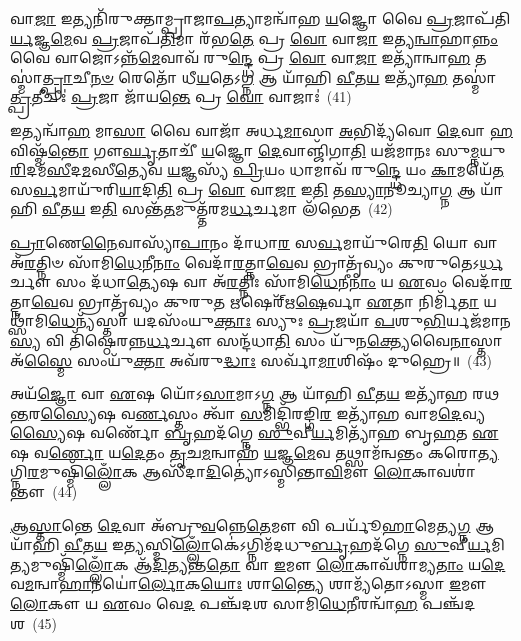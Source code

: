 𑌵𑌾\-\ul{𑌜𑌾} 𑌇𑌤𑍍𑌯𑌨𑌿᳴𑌰𑍁𑌕𑍍𑌤𑌾𑌮𑍍𑌪𑍍𑌰𑌾𑌜𑌾\-\ul{𑌪}\-𑌤𑍍𑌯𑌾𑌮𑌨𑍍𑌵𑌾᳴𑌹 \ul{𑌯}\-𑌜𑍍𑌞𑍋 𑌵𑍈 \ul{𑌪𑍍𑌰}\-𑌜𑌾𑌪᳴𑌤𑌿\-\ul{𑌰𑍍𑌯}\-𑌜𑍍𑌞\-\ul{𑌮𑍇}\-𑌵 \ul{𑌪𑍍𑌰}\-𑌜𑌾𑌪᳴\-\ul{𑌤𑌿}\-𑌮𑌾 𑌰᳴𑌭\-\ul{𑌤𑍇} 𑌪𑍍𑌰 \ul{𑌵𑍋} 𑌵𑌾\-\ul{𑌜𑌾} 𑌇𑌤𑍍𑌯\-\ul{𑌨𑍍𑌵𑌾}\-𑌹𑌾\-\ul{𑌨𑍍𑌨𑌂} 𑌵𑍈 𑌵𑌾𑌜𑍋\-𑌽𑌨𑍍𑌨᳴\-\ul{𑌮𑍇}\-𑌵𑌾𑌵᳴ 𑌰𑍁\-\ul{𑌨𑍍𑌦𑍍𑌧𑍇} 𑌪𑍍𑌰 \ul{𑌵𑍋} 𑌵𑌾\-\ul{𑌜𑌾} 𑌇𑌤𑍍𑌯𑌾᳴𑌨𑍍𑌵𑌾\-\ul{𑌹} 𑌤𑌸𑍍𑌮𑌾॑\-\ul{𑌤𑍍𑌪𑍍𑌰𑌾}\-𑌚𑍀\-\ul{𑌨}\-\-\ul{𑍞} 𑌰𑍇𑌤𑍋᳴ 𑌧𑍀\-\ul{𑌯}\-𑌤𑍇\-𑌽\-\ul{𑌗𑍍𑌨} 𑌆 𑌯𑌾᳴𑌹𑌿 \ul{𑌵𑍀}\-𑌤\-\ul{𑌯} 𑌇𑌤𑍍𑌯𑌾᳴\-\ul{𑌹} 𑌤𑌸𑍍𑌮𑌾॑\-\ul{𑌤𑍍𑌪𑍍𑌰}\-𑌤𑍀𑌚𑍀𑌃॑ \ul{𑌪𑍍𑌰}\-𑌜𑌾 𑌜𑌾᳴𑌯\-\ul{𑌨𑍍𑌤𑍇} 𑌪𑍍𑌰 \ul{𑌵𑍋} 𑌵𑌾𑌜𑌾𑌃॑~(41)

𑌇𑌤𑍍𑌯𑌨𑍍𑌵𑌾᳴\-\ul{𑌹} 𑌮𑌾\-\ul{𑌸𑌾} 𑌵𑍈 𑌵𑌾𑌜𑌾᳴ 𑌅𑌰𑍍𑌧\-\ul{𑌮𑌾}\-𑌸𑌾 \ul{𑌅}\-𑌭𑌿𑌦𑍍𑌯᳴𑌵𑍋 \ul{𑌦𑍇}\-𑌵𑌾 \ul{𑌹}\-𑌵𑌿𑌷𑍍𑌮᳴\-\ul{𑌨𑍍𑌤𑍋} 𑌗𑍗\-\ul{𑌰𑍍𑌘𑍃}\-𑌤𑌾𑌚𑍀᳴ \ul{𑌯}\-𑌜𑍍𑌞𑍋 \ul{𑌦𑍇}\-𑌵𑌾𑌞𑍍𑌜𑌿᳴𑌗𑌾\-\ul{𑌤𑌿} 𑌯𑌜᳴𑌮𑌾𑌨𑌃 𑌸𑍁\-\ul{𑌮𑍍𑌨}\-𑌯𑍁\-\ul{𑌰𑌿}\-𑌦𑌮᳴\-\ul{𑌸𑍀}\-𑌦\-\ul{𑌮}\-𑌸𑍀\-\ul{𑌤𑍍𑌯𑍇}\-𑌵 \ul{𑌯}\-𑌜𑍍𑌞𑌸𑍍𑌯᳴ \ul{𑌪𑍍𑌰𑌿}\-𑌯𑌂 𑌧𑌾𑌮𑌾𑌵᳴ 𑌰𑍁\-\ul{𑌨𑍍𑌦𑍍𑌧𑍇} 𑌯𑌂 \ul{𑌕𑌾}\-𑌮𑌯𑍇᳴\-\ul{𑌤} 𑌸\-\ul{𑌰𑍍𑌵}\-𑌮𑌾𑌯𑍁᳴𑌰𑌿\-\ul{𑌯𑌾}\-𑌦𑌿\-\ul{𑌤𑌿} 𑌪𑍍𑌰 \ul{𑌵𑍋} 𑌵𑌾\-\ul{𑌜𑌾} 𑌇\-\ul{𑌤𑌿} 𑌤\-\ul{𑌸𑍍𑌯𑌾}\-𑌨𑍂𑌚𑍍𑌯𑌾\-\ul{𑌗𑍍𑌨} 𑌆 𑌯𑌾᳴𑌹𑌿 \ul{𑌵𑍀}\-𑌤\-\ul{𑌯} 𑌇\-\ul{𑌤𑌿} 𑌸𑌨𑍍𑌤᳴\-\ul{𑌤}\-𑌮𑍁𑌤𑍍𑌤᳴𑌰𑌮\-\ul{𑌰𑍍𑌧}\-𑌰𑍍𑌚𑌮𑌾 𑌲᳴𑌭𑍇𑌤~(42)

\-\ul{𑌪𑍍𑌰𑌾}\-𑌣𑍇\-\ul{𑌨𑍈}\-𑌵𑌾𑌸𑍍𑌯𑌾᳴\-\ul{𑌪𑌾}\-𑌨𑌂 𑌦𑌾᳴𑌧𑌾\-\ul{𑌰} 𑌸\-\ul{𑌰𑍍𑌵}\-𑌮𑌾𑌯𑍁᳴𑌰𑍇\-\ul{𑌤𑌿} 𑌯𑍋 𑌵𑌾 𑌅᳴\-\ul{𑌰}\-𑌤𑍍𑌨𑌿𑍞 𑌸𑌾᳴𑌮𑌿\-\ul{𑌧𑍇}\-𑌨𑍀\-\ul{𑌨𑌾𑌂} 𑌵𑍇𑌦𑌾᳴\-\ul{𑌰}\-𑌤𑍍𑌨𑌾\-\ul{𑌵𑍇}\-𑌵 𑌭𑍍𑌰𑌾𑌤𑍃᳴𑌵𑍍𑌯𑌂 𑌕𑍁𑌰𑍁𑌤𑍇\-𑌽\-\ul{𑌰𑍍𑌧}\-𑌰𑍍𑌚𑍗 𑌸𑌂 𑌦᳴𑌧𑌾\-\ul{𑌤𑍍𑌯𑍇}\-𑌷 𑌵𑌾 𑌅᳴\-\ul{𑌰}\-𑌤𑍍𑌨𑌿𑌃 𑌸𑌾᳴𑌮𑌿\-\ul{𑌧𑍇}\-𑌨𑍀\-\ul{𑌨𑌾𑌂} 𑌯 \ul{𑌏}\-𑌵𑌂 𑌵𑍇𑌦𑌾᳴\-\ul{𑌰}\-𑌤𑍍𑌨𑌾\-\ul{𑌵𑍇}\-𑌵 𑌭𑍍𑌰𑌾𑌤𑍃᳴𑌵𑍍𑌯𑌂 𑌕𑍁𑌰𑍁\-\ul{𑌤} 𑌋𑌷𑍇𑌰𑍍\mbox{}᳴𑌋\-\ul{𑌷𑍇}\-𑌰𑍍𑌵𑌾 \ul{𑌏}\-𑌤𑌾 𑌨𑌿𑌰𑍍𑌮𑌿᳴\-\ul{𑌤𑌾} 𑌯𑌥𑍍𑌸𑌾᳴𑌮𑌿\-\ul{𑌧𑍇}\-𑌨𑍍𑌯᳴𑌸𑍍𑌤𑌾 𑌯𑌦𑌸𑌂᳴𑌯𑍁\-\ul{𑌕𑍍𑌤𑌾𑌃} 𑌸𑍍𑌯𑍁𑌃 \ul{𑌪𑍍𑌰}\-𑌜𑌯𑌾᳴ \ul{𑌪}\-𑌶𑍁\-\ul{𑌭𑌿}\-𑌰𑍍𑌯𑌜᳴𑌮𑌾𑌨\-\ul{𑌸𑍍𑌯} 𑌵𑌿 𑌤𑌿᳴𑌷𑍍𑌠𑍇𑌰𑌨𑍍𑌨\-\ul{𑌰𑍍𑌧}\-𑌰𑍍𑌚𑍗 𑌸𑌨𑍍𑌦᳴𑌧𑌾\-\ul{𑌤𑌿} 𑌸𑌂 𑌯𑍁᳴𑌨\-\ul{𑌕𑍍𑌤𑍍𑌯𑍇}\-𑌵𑍈\-\ul{𑌨𑌾}\-𑌸𑍍𑌤𑌾 𑌅᳴\-\ul{𑌸𑍍𑌮𑍈} 𑌸𑌂𑌯𑍁᳴\-\ul{𑌕𑍍𑌤𑌾} 𑌅𑌵᳴𑌰𑍁\-\ul{𑌦𑍍𑌧𑌾𑌃} 𑌸𑌰𑍍𑌵𑌾᳴\-\ul{𑌮𑌾}\-𑌶𑌿𑌷𑌂᳴ 𑌦𑍁𑌹𑍍𑌰𑍇॥~(43)


{\anuvakamend[{\-\ul{𑌬}\-𑌰𑍍\mbox{}𑌸𑌂 𑌵𑍋᳴ 𑌜𑌾𑌯\-\ul{𑌨𑍍𑌤𑍇} 𑌪𑍍𑌰 \ul{𑌵𑍋} 𑌵𑌾𑌜𑌾᳴ 𑌲𑌭𑍇𑌤 𑌦𑌧𑌾\-\ul{𑌤𑌿} 𑌸𑌨𑍍𑌦𑌶᳴ 𑌚}]}%

𑌅𑌯᳴\-\ul{𑌜𑍍𑌞𑍋} 𑌵𑌾 \ul{𑌏}\-𑌷 𑌯𑍋᳴\-𑌽\-\ul{𑌸𑌾}\-𑌮𑌾\-𑌽\-\ul{𑌗𑍍𑌨} 𑌆 𑌯𑌾᳴𑌹𑌿 \ul{𑌵𑍀}\-𑌤\-\ul{𑌯} 𑌇𑌤𑍍𑌯𑌾᳴𑌹 𑌰𑌥\-\ul{𑌨𑍍𑌤}\-𑌰\-\ul{𑌸𑍍𑌯𑍈}\-𑌷 𑌵\-\ul{𑌰𑍍𑌣}\-𑌸𑍍𑌤𑌂 𑌤𑍍𑌵𑌾᳴ \ul{𑌸}\-𑌮𑌿𑌦𑍍𑌭𑌿᳴𑌰𑌙𑍍𑌗𑌿\-\ul{𑌰} 𑌇𑌤𑍍𑌯𑌾᳴𑌹 𑌵𑌾𑌮\-\ul{𑌦𑍇}\-𑌵𑍍𑌯\-\ul{𑌸𑍍𑌯𑍈}\-𑌷 𑌵𑌰𑍍𑌣𑍋᳴ \ul{𑌬𑍃}\-𑌹𑌦᳴𑌗𑍍𑌨𑍇 \ul{𑌸𑍁}\-𑌵𑍀\-\ul{𑌰𑍍𑌯}\-𑌮𑌿𑌤𑍍𑌯𑌾᳴𑌹 𑌬𑍃\-\ul{𑌹}\-𑌤 \ul{𑌏}\-𑌷 𑌵\-\ul{𑌰𑍍𑌣𑍋} 𑌯\-\ul{𑌦𑍇}\-𑌤𑌂 \ul{𑌤𑍃}\-𑌚\-\ul{𑌮}\-𑌨𑍍𑌵𑌾𑌹᳴ \ul{𑌯}\-𑌜𑍍𑌞\-\ul{𑌮𑍇}\-𑌵 𑌤𑌥𑍍𑌸𑌾𑌮᳴𑌨𑍍𑌵𑌨𑍍𑌤𑌂 𑌕𑌰𑍋\-\ul{𑌤𑍍𑌯}\-𑌗𑍍𑌨𑌿\-\ul{𑌰}\-𑌮𑍁𑌷𑍍𑌮𑌿᳴\-\ul{𑌲𑍍𑌲𑍋𑌁}\-𑌕 𑌆𑌸𑍀᳴𑌦𑌾\-\ul{𑌦𑌿}\-𑌤𑍍𑌯𑍋॑\-𑌽𑌸𑍍𑌮𑌿𑌨𑍍𑌤𑌾\-\ul{𑌵𑌿}\-𑌮𑍗 \ul{𑌲𑍋}\-𑌕𑌾𑌵𑌶𑌾॑𑌨𑍍𑌤𑍗~(44)

\-\ul{𑌆}\-\-\ul{𑌸𑍍𑌤𑌾}\-𑌨𑍍𑌤𑍇 \ul{𑌦𑍇}\-𑌵𑌾 𑌅᳴𑌬𑍍𑌰𑍁\-\ul{𑌵}\-𑌨𑍍𑌨𑍇\-\ul{𑌤𑍇}\-𑌮𑍗 𑌵𑌿 𑌪𑌰𑍍𑌯𑍂᳴\-\ul{𑌹𑌾}\-𑌮𑍇𑌤𑍍𑌯\-\ul{𑌗𑍍𑌨} 𑌆 𑌯𑌾᳴𑌹𑌿 \ul{𑌵𑍀}\-𑌤\-\ul{𑌯} 𑌇\-\ul{𑌤𑍍𑌯}\-𑌸𑍍𑌮𑌿\-\ul{𑌲𑍍𑌲𑍋𑌁}\-𑌕𑍇॑\-𑌽𑌗𑍍𑌨𑌿𑌮᳴𑌦𑌧𑍁\-\ul{𑌰𑍍𑌬𑍃}\-𑌹𑌦᳴𑌗𑍍𑌨𑍇 \ul{𑌸𑍁}\-𑌵𑍀\-\ul{𑌰𑍍𑌯}\-𑌮𑌿\-\ul{𑌤𑍍𑌯}\-𑌮𑍁𑌷𑍍𑌮𑌿᳴\-\ul{𑌲𑍍𑌲𑍋𑌁}\-𑌕 𑌆᳴\-\ul{𑌦𑌿}\-𑌤𑍍𑌯𑌨𑍍𑌤\-\ul{𑌤𑍋} 𑌵𑌾 \ul{𑌇}\-𑌮𑍗 \ul{𑌲𑍋}\-𑌕𑌾𑌵᳴𑌶𑌾𑌮𑍍𑌯\-\ul{𑌤𑌾𑌂} 𑌯\-\ul{𑌦𑍇}\-𑌵\-\ul{𑌮}\-𑌨𑍍𑌵𑌾\-\ul{𑌹𑌾}\-𑌨𑌯𑍋॑\-\ul{𑌰𑍍𑌲𑍋}\-𑌕\-\ul{𑌯𑍋𑌃} 𑌶𑌾\-\ul{𑌨𑍍𑌤𑍍𑌯𑍈} 𑌶𑌾𑌮𑍍𑌯᳴𑌤𑍋\-𑌽𑌸𑍍𑌮𑌾 \ul{𑌇}\-𑌮𑍗 \ul{𑌲𑍋}\-𑌕𑍗 𑌯 \ul{𑌏}\-𑌵𑌂 𑌵𑍇\-\ul{𑌦} 𑌪𑌞𑍍𑌚᳴𑌦𑌶 𑌸𑌾𑌮𑌿\-\ul{𑌧𑍇}\-𑌨𑍀𑌰𑌨𑍍𑌵𑌾᳴\-\ul{𑌹} 𑌪𑌞𑍍𑌚᳴𑌦𑌶~(45)

